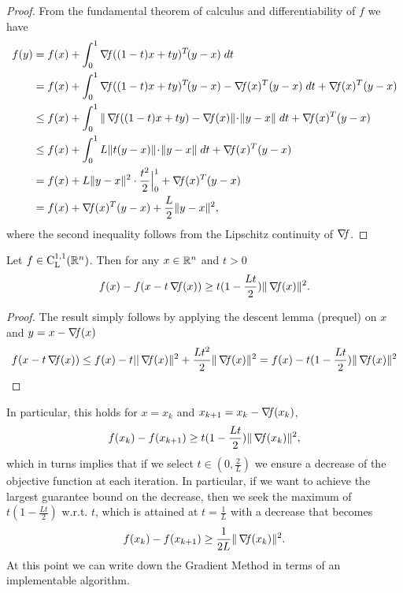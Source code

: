 \documentclass[10pt,a4paper]{article}
\begin{document}
\begin{proof}
From the fundamental theorem of calculus and differentiability of $f$ we have 
\begin{equation*}
	\begin{split}
		f (y) & = f(x) + \int_{0}^{1} \grad((1-t)x + t y)^T\! (y-x) \; dt\\
		& = f(x) + \int_{0}^{1} \grad((1-t)x + t y)^T\! (y-x) - \grad(x)^T(y-x) \; dt + \grad(x)^T(y-x)\\ 
		&\leq f(x) + \int_{0}^{1} \| \grad((1-t)x + t y) - \grad(x)\|\! \cdot\! \|y-x\| \; dt + \grad(x)^T(y-x)\\  
		& \leq f(x) + \int_{0}^{1} L \| t(y-x) \|\! \cdot\! \|y-x\| \; dt + \grad(x)^T(y-x)\\
		& = f(x) + L\|y-x\|^2 \cdot \frac{t^2}{2} \Big|_0^1 + \grad(x)^T(y-x)\\
		& = f(x) + \grad(x)^T(y-x) + \frac{L}{2} \|y-x\|^2,
	\end{split}
\end{equation*}
where the second inequality follows from the Lipschitz continuity of $\operatorname*{\mathit{\nabla \!f}}$.
\end{proof}
\begin{lemma}\label{lemma:descent} Let $f\in \mathord{\mathrm{C^{1,1}_{L}}}(\mathbb{R}^n)$. Then for any $x \in \mathbb{R}^n$ and $t>0$
	\begin{equation*}
		f(x) - f(x-t\operatorname*{\mathit{\nabla \!f}}(x)) \geq t (1-\frac{Lt}{2}) \| \operatorname*{\mathit{\nabla \!f}}(x)\|^2.
	\end{equation*}
\end{lemma}
\begin{proof}
	The result simply follows by applying the descent lemma (prequel) on $x$ and $y=x-\operatorname*{\mathit{\nabla \!f}}(x)$
	\begin{equation*}
		f(x-t\operatorname*{\mathit{\nabla \!f}}(x))\leq f(x) -t ||\operatorname*{\mathit{\nabla \!f}}(x)\|^2 + \frac{Lt^2}{2} \|\operatorname*{\mathit{\nabla \!f}}(x)\|^2 = f(x) - t (1-\frac{Lt}{2}) \| \operatorname*{\mathit{\nabla \!f}}(x)\|^2
	\end{equation*}
\end{proof}
\noindent In particular, this holds for $x=x_k$ and $x_{k+1} = x_k -\operatorname*{\mathit{\nabla \!f}}(x_k)$,
\begin{equation*}
	f(x_k) - f(x_{k+1}) \geq t (1-\frac{Lt}{2}) \| \operatorname*{\mathit{\nabla \!f}}(x_k)\|^2,
\end{equation*}
which in turns implies that if we select $t\in (0,\frac{2}{L})$ we ensure a decrease of the objective function at each iteration. In particular, if we want to achieve the largest guarantee bound on the decrease, then we seek the maximum of $t (1-\frac{Lt}{2})$ w.r.t. $t$, which is attained at $t=\frac{1}{L}$ with a decrease that becomes
\begin{equation}\label{eq:decrease}
	f(x_k) - f(x_{k+1}) \geq \frac{1}{2L} \| \operatorname*{\mathit{\nabla \!f}}(x_k)\|^2.
\end{equation}
At this point we can write down the Gradient Method in terms of an implementable algorithm.
\end{document}
